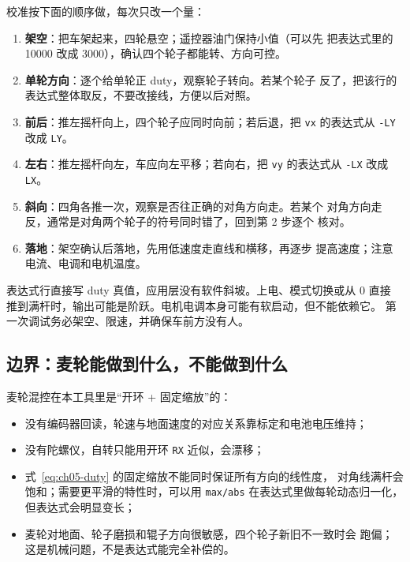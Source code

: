 校准按下面的顺序做，每次只改一个量：

\begin{enumerate}
  \item \textbf{架空}：把车架起来，四轮悬空；遥控器油门保持小值（可以先
        把表达式里的 10000 改成 3000），确认四个轮子都能转、方向可控。
  \item \textbf{单轮方向}：逐个给单轮正 duty，观察轮子转向。若某个轮子
        反了，把该行的表达式整体取反，不要改接线，方便以后对照。
  \item \textbf{前后}：推左摇杆向上，四个轮子应同时向前；若后退，把
        \texttt{vx} 的表达式从 \texttt{-LY} 改成 \texttt{LY}。
  \item \textbf{左右}：推左摇杆向左，车应向左平移；若向右，把
        \texttt{vy} 的表达式从 \texttt{-LX} 改成 \texttt{LX}。
  \item \textbf{斜向}：四角各推一次，观察是否往正确的对角方向走。若某个
        对角方向走反，通常是对角两个轮子的符号同时错了，回到第 2 步逐个
        核对。
  \item \textbf{落地}：架空确认后落地，先用低速度走直线和横移，再逐步
        提高速度；注意电流、电调和电机温度。
\end{enumerate}

\begin{note}
表达式行直接写 duty 真值，应用层没有软件斜坡。上电、模式切换或从 0 直接
推到满杆时，输出可能是阶跃。电机电调本身可能有软启动，但不能依赖它。
第一次调试务必架空、限速，并确保车前方没有人。
\end{note}

\subsection{边界：麦轮能做到什么，不能做到什么}

麦轮混控在本工具里是“开环 + 固定缩放”的：

\begin{itemize}
  \item 没有编码器回读，轮速与地面速度的对应关系靠标定和电池电压维持；
  \item 没有陀螺仪，自转只能用开环 \texttt{RX} 近似，会漂移；
  \item 式~\eqref{eq:ch05-duty} 的固定缩放不能同时保证所有方向的线性度，
        对角线满杆会饱和；需要更平滑的特性时，可以用 \texttt{max/abs}
        在表达式里做每轮动态归一化，但表达式会明显变长；
  \item 麦轮对地面、轮子磨损和辊子方向很敏感，四个轮子新旧不一致时会
        跑偏；这是机械问题，不是表达式能完全补偿的。
\end{itemize}

